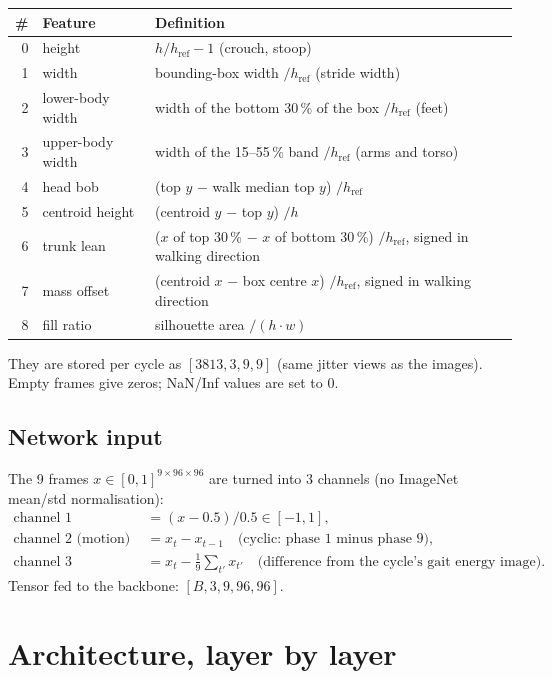 \documentclass[10pt,a4paper]{article}
\begin{document}
\begin{center}
\begin{tabularx}{\textwidth}{@{}rlL@{}}
\toprule
\# & Feature & Definition \\
 & height & $h / h_{\text{ref}} - 1$ (crouch, stoop) \\
1 & width & bounding-box width $/ h_{\text{ref}}$ (stride width) \\
2 & lower-body width & width of the bottom 30\,\% of the box $/ h_{\text{ref}}$ (feet) \\
3 & upper-body width & width of the 15--55\,\% band $/ h_{\text{ref}}$ (arms and torso) \\
4 & head bob & (top $y$ $-$ walk median top $y$) $/ h_{\text{ref}}$ \\
5 & centroid height & (centroid $y$ $-$ top $y$) $/ h$ \\
6 & trunk lean & ($x$ of top 30\,\% $-$ $x$ of bottom 30\,\%) $/ h_{\text{ref}}$, signed in walking direction \\
7 & mass offset & (centroid $x$ $-$ box centre $x$) $/ h_{\text{ref}}$, signed in walking direction \\
8 & fill ratio & silhouette area $/ (h \cdot w)$ \\
\bottomrule
\end{tabularx}
\end{center}
They are stored per cycle as $[3813, 3, 9, 9]$ (same jitter views as the images).
Empty frames give zeros; NaN/Inf values are set to 0.

\subsection{Network input}
The 9 frames $x \in [0,1]^{9\times96\times96}$ are turned into 3 channels
(no ImageNet mean/std normalisation):
\begin{align*}
\text{channel 1 (silhouette)} &= (x - 0.5)/0.5 \in [-1, 1],\\
\text{channel 2 (motion)} &= x_t - x_{t-1} \quad \text{(cyclic: phase 1 minus phase 9)},\\
\text{channel 3 (deviation)} &= x_t - \tfrac{1}{9}\textstyle\sum_{t'} x_{t'} \quad \text{(difference from the cycle's gait energy image)}.
\end{align*}
Tensor fed to the backbone: $[B, 3, 9, 96, 96]$.

\section{Architecture, layer by layer}
\end{document}
